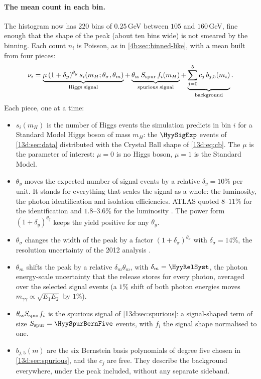 \paragraph{The mean count in each bin.}
The histogram now has $220$ bins of $0.25\,$GeV between $105$ and $160\,$GeV, fine enough
that the shape of the peak (about ten bins wide) is not smeared by the binning. Each count
$n_i$ is Poisson, as in \cref{4b:sec:binned-like}, with a mean built from four pieces:
\begin{equation}
  \nu_i
  =\underbrace{\mu\,(1+\delta_y)^{\theta_y}\,s_i(m_H;\theta_\sigma,\theta_m)}_{\text{Higgs signal}}
   +\underbrace{\theta_{\rm ss}\,S_{\rm spur}\,f_i(m_H)}_{\text{spurious signal}}
   +\underbrace{\sum_{j=0}^{5}c_j\,b_{j,5}(m_i)}_{\text{background}} .
  \label{13d:eq:nu}
\end{equation}
Each piece, one at a time:
\begin{itemize}[itemsep=1pt,leftmargin=1.2em]
  \item $s_i(m_H)$ is the number of Higgs events the simulation predicts in bin $i$ for a
        Standard Model Higgs boson of mass $m_H$: the $\HyySigExp$ events of
        \cref{13d:sec:data} distributed with the Crystal Ball shape of
        \eqref{13d:eq:cb}. The  $\mu$  is the parameter of interest: $\mu=0$
        is no Higgs boson, $\mu=1$ is the Standard Model.
  \item $\theta_y$ moves the expected number of signal events by a relative
        $\delta_y=10\%$ per unit. It stands for everything that scales the signal as a
        whole: the luminosity, the photon identification and isolation efficiencies.
        ATLAS quoted $8$--$11\%$ for the identification and $1.8$--$3.6\%$ for the
        luminosity . The power form $(1+\delta_y)^{\theta_y}$
        keeps the yield positive for any $\theta_y$.
  \item $\theta_\sigma$ changes the width of the peak by a factor
        $(1+\delta_\sigma)^{\theta_\sigma}$ with $\delta_\sigma=14\%$, the resolution
        uncertainty of the 2012 analysis .
  \item $\theta_m$ shifts the peak by a relative $\delta_m\theta_m$, with
        $\delta_m=\HyyRelSyst$, the photon energy-scale uncertainty that the release
        stores for every photon, averaged over the selected signal events (a $1\%$ shift
        of both photon energies moves $m_{\gamma\gamma}\propto\sqrt{E_1E_2}$ by $1\%$).
  \item $\theta_{\rm ss}S_{\rm spur}f_i$ is the spurious signal of
        \cref{13d:sec:spurious}: a signal-shaped term of size $S_{\rm spur}=\HyySpurBernFive$
        events, with $f_i$ the signal shape normalised to one.
  \item $b_{j,5}(m)$ are the six Bernstein basis polynomials of degree five chosen in
        \cref{13d:sec:spurious}, and the $c_j$ are free. They describe the background
        everywhere, under the peak included, without any separate sideband.
\end{itemize}

